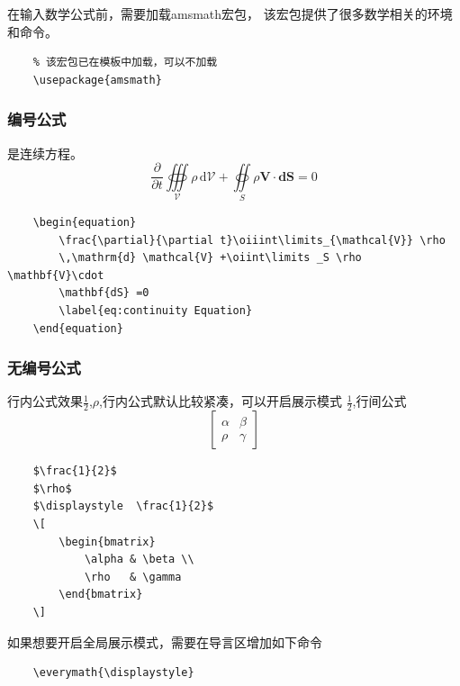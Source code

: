 在输入数学公式前，需要加载{\ttfamily amsmath}宏包，
该宏包提供了很多数学相关的环境和命令。
\begin{lstlisting}
    % 该宏包已在模板中加载，可以不加载
    \usepackage{amsmath}
\end{lstlisting}

\subsubsection{编号公式}
 是连续方程。
\begin{equation}
    \frac{\partial}{\partial t}\oiiint\limits_{\mathcal{V}} \rho 
    \,\mathrm{d} \mathcal{V} +\oiint\limits _S \rho \mathbf{V}\cdot 
    \mathbf{dS} =0
    \label{eq:continuity Equation}
\end{equation}

\begin{lstlisting}
    \begin{equation}
        \frac{\partial}{\partial t}\oiiint\limits_{\mathcal{V}} \rho 
        \,\mathrm{d} \mathcal{V} +\oiint\limits _S \rho \mathbf{V}\cdot 
        \mathbf{dS} =0
        \label{eq:continuity Equation}
    \end{equation}
\end{lstlisting}

\subsubsection{无编号公式}
行内公式效果$\frac{1}{2}$,$\rho$,行内公式默认比较紧凑，可以开启展示模式
$\displaystyle  \frac{1}{2}$,行间公式 
\[
    \begin{bmatrix}
        \alpha & \beta \\ 
        \rho   & \gamma 
    \end{bmatrix}
\]

\begin{lstlisting}
    $\frac{1}{2}$
    $\rho$
    $\displaystyle  \frac{1}{2}$
    \[
        \begin{bmatrix}
            \alpha & \beta \\ 
            \rho   & \gamma 
        \end{bmatrix}
    \]
\end{lstlisting}

如果想要开启全局展示模式，需要在导言区增加如下命令
\begin{lstlisting}
    \everymath{\displaystyle}
\end{lstlisting}

